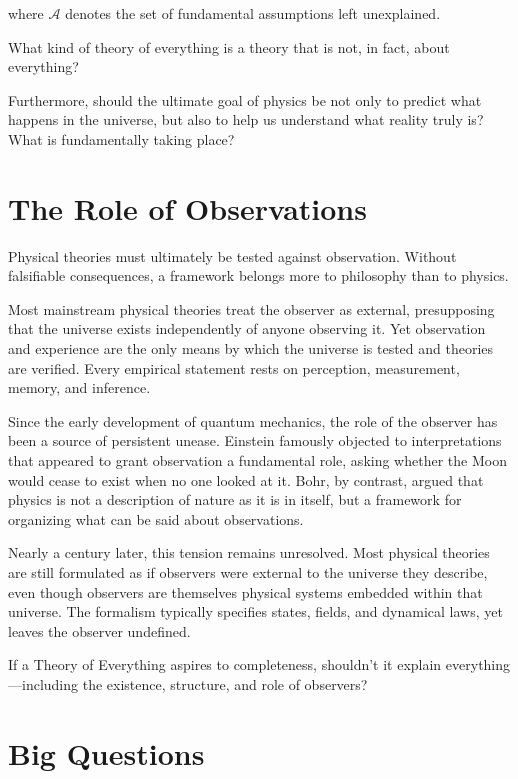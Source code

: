 where $\mathcal{A}$ denotes the set of fundamental assumptions left unexplained.

What kind of theory of everything is a theory that is not, in fact, about everything?

Furthermore, should the ultimate goal of physics be not only to predict what happens in the universe, but also to help us understand what reality truly is? What is fundamentally taking place?



\section{The Role of Observations}

Physical theories must ultimately be tested against observation. Without falsifiable consequences, a framework belongs more to philosophy than to physics.

Most mainstream physical theories treat the observer as external, presupposing that the universe exists independently of anyone observing it. Yet observation and experience are the only means by which the universe is tested and theories are verified. Every empirical statement rests on perception, measurement, memory, and inference.

Since the early development of quantum mechanics, the role of the observer has been a source of persistent unease. Einstein famously objected to interpretations that appeared to grant observation a fundamental role, asking whether the Moon would cease to exist when no one looked at it. Bohr, by contrast, argued that physics is not a description of nature as it is in itself, but a framework for organizing what can be said about observations.

Nearly a century later, this tension remains unresolved. Most physical theories are still formulated as if observers were external to the universe they describe, even though observers are themselves physical systems embedded within that universe. The formalism typically specifies states, fields, and dynamical laws, yet leaves the observer undefined.

If a Theory of Everything aspires to completeness, shouldn't it explain everything—including the existence, structure, and role of observers?



\section{Big Questions}

